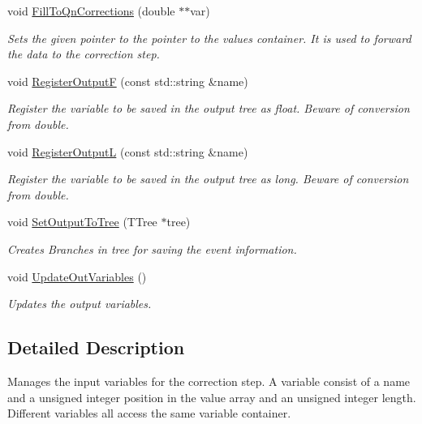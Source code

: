 \begin{DoxyCompactItemize}
void \mbox{\hyperlink{classQn_1_1VariableManager_a27dbc1f8e5e99fe8044fb2f5efaa2d2b}{Fill\+To\+Qn\+Corrections}} (double $\ast$$\ast$var)
\begin{DoxyCompactList}\small\item\em Sets the given pointer to the pointer to the values container. It is used to forward the data to the correction step. \end{DoxyCompactList}\item 
void \mbox{\hyperlink{classQn_1_1VariableManager_a818bd066ddc4cff8372311714a6a7bc5}{Register\+OutputF}} (const std\+::string \&name)
\begin{DoxyCompactList}\small\item\em Register the variable to be saved in the output tree as float. Beware of conversion from double. \end{DoxyCompactList}\item 
void \mbox{\hyperlink{classQn_1_1VariableManager_a27695a4281a76e566ef0d0203520980e}{Register\+OutputL}} (const std\+::string \&name)
\begin{DoxyCompactList}\small\item\em Register the variable to be saved in the output tree as long. Beware of conversion from double. \end{DoxyCompactList}\item 
void \mbox{\hyperlink{classQn_1_1VariableManager_aff3e15625af5e34078a21ab3b6e834e7}{Set\+Output\+To\+Tree}} (T\+Tree $\ast$tree)
\begin{DoxyCompactList}\small\item\em Creates Branches in tree for saving the event information. \end{DoxyCompactList}\item 
\mbox{\label{classQn_1_1VariableManager_a52f61cd63fc4f0ffa4952df2f8180525}} 
void \mbox{\hyperlink{classQn_1_1VariableManager_a52f61cd63fc4f0ffa4952df2f8180525}{Update\+Out\+Variables}} ()
\begin{DoxyCompactList}\small\item\em Updates the output variables. \end{DoxyCompactList}\end{DoxyCompactItemize}


\subsection{Detailed Description}
Manages the input variables for the correction step. A variable consist of a name and a unsigned integer position in the value array and an unsigned integer length. Different variables all access the same variable container. 

